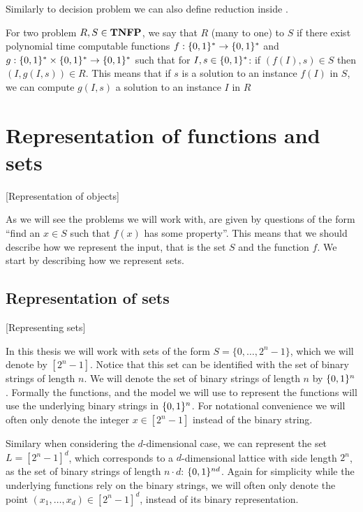 Similarly to decision problem we can also define reduction inside \TFNP{}.
\begin{definition}[Reduction]
    For two problem $R, S \in \textbf{TNFP}$, we say that $R$  (many to one) to $S$ if there exist polynomial time computable functions $f : \{0, 1\}^*
        \rightarrow
        \{0, 1\}^*$ and $g : \{0, 1\}^* \times \{0, 1\}^* \rightarrow \{0, 1\}^*$ such that for $I, s \in \{0, 1\}^*$: if $(f(I), s) \in S$ then $(I, g(I, s)) \in R$.
    This means that if $s$ is a solution to an instance $f(I)$ in $S$, we can compute $g(I, s)$ a solution to an instance $I$ in $R$
\end{definition}

\section{Representation of functions and sets}[Representation of objects]

As we will see the problems we will work with, are given by questions of the form ``find an $x \in S$ such that $f(x)$ has some property''. This means that we should describe how we represent the input, that is the set $S$ and the function $f$. We start by describing how we represent sets.

\subsection{Representation of sets}[Representing sets]

In this thesis we will work with sets of the form $S = \{0, \dots, 2^n - 1\}$, which we will denote by $[2^n - 1]$. Notice that this set can be identified with the set of binary strings of length $n$. We will denote the set of binary strings of length $n$ by $\{0, 1\}^n$. Formally the functions, and the model we will use to represent the functions will use the underlying binary strings in $\{0, 1\}^n$. For notational convenience we will often only denote the integer $x \in [2^n - 1]$ instead of the binary string.

Similary when considering the $d$-dimensional case, we can represent the set $L = [2^n - 1]^d$, which corresponds to a $d$-dimensional lattice with side length $2^n$, as the set of binary strings of length $n \cdot d$: $\{0, 1\}^{nd}$. Again for simplicity while the underlying functions rely on the binary strings, we will often only denote the point $(x_1, \dots, x_d) \in [2^n - 1]^d$, instead of its binary representation.

